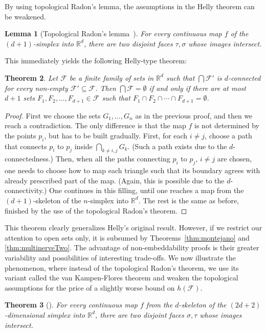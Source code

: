 \documentclass[a4paper,12pt]{amsart}
\newcommand{\R}{\mathbb{R}} 	%
\newcommand{\F}{\mathcal{F}} 	%
\newtheorem{theorem}{Theorem}
\newtheorem{lemma}[theorem]{Lemma}
\theoremstyle{definition}
\begin{document}
By using topological Radon's lemma, the assumptions in the Helly theorem can be weakened.
\begin{lemma}[Topological Radon's lemma~\cite{Baj79}]
For every continuous map $f$ of the $(d+1)$-simplex into $\R^d$, there are two disjoint faces $\tau,\sigma$ whose images intersect. 
\end{lemma}
This immediately yields the following Helly-type theorem:
\begin{theorem}\cite{m-httucs-97}\label{thm:hellyMat}
 Let $\mathcal F$ be a finite family of sets in $\R^d$ such that $\bigcap \mathcal F'$ is $d$-connected for every non-empty $\mathcal F'\subseteq\mathcal F$. Then $\bigcap \mathcal F=\emptyset$ if and only if there are at most $d+1$ sets $F_1,F_2,\ldots, F_{d+1}\in\mathcal F$ such that $F_1\cap F_2\cap\cdots\cap F_{d+1}=\emptyset$.
\end{theorem}
\begin{proof}
First we choose the sets $G_1,\ldots, G_n$ as in the previous proof, and then we reach a contradiction.
The only difference is that the map $f$ is not determined by the points $p_i$, but has to be built gradually. First, for each $i\neq j$, choose a path that connects $p_i$ to $p_j$ inside $\bigcap_{k\neq i,j}G_k$. (Such a path exists due to the $d$-connectedness.) Then, when all the paths connecting $p_i$ to $p_j$, $i\neq j$ are chosen,
one needs to choose how to map each triangle such that its boundary agrees with already prescribed part of the map. (Again, this is possible due to the $d$-connectivity.) One continues in this filling, until one reaches a map from the $(d+1)$-skeleton of the $n$-simplex into $\R^d$. The rest is the same as before, finished by the use of the topological Radon's theorem.
\end{proof}
This theorem clearly generalizes Helly's original result. However, if we restrict our attention to open sets only, it is subsumed by Theorems~\ref{thm:montejano} and \ref{thm:multinerveTwo}. 
The advantage of non-embeddability proofs is their greater variability and possibilities of interesting trade-offs. We now illustrate the phenomenon, where instead of the topological Radon's theorem, we use its variant called the van Kampen-Flores theorem and weaken the topological assumptions for the price of a slightly worse bound on $h(\F)$.
\begin{theorem}[\cite{vanKampen:KomplexeInEuklidischenRaeumen-1932}]
 For every continuous map $f$ from the $d$-skeleton of the $(2d+2)$-dimensional simplex into $\R^d$, there are two disjoint faces $\sigma,\tau$ whose images intersect. 
\end{theorem}
\end{document}
